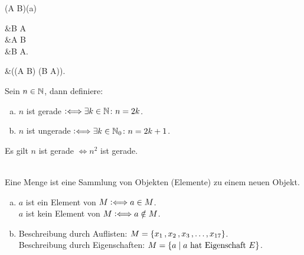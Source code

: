 \documentclass[../ana1.tex]{subfiles}
\begin{document}
\begin{bem}\leavevmode
	\begin{alignenum}{(A \Leftrightarrow B)}{(a)}
		\begin{aitem}
			 &\Leftrightarrow B  A\\
										  &\Leftrightarrow A  B\\
										  &\Leftrightarrow \neg B \Rightarrow \neg A.
		\end{aitem}\begin{aitem}
			 &\Leftrightarrow ((A \Rightarrow B) \wedge (B \Rightarrow A)).
		\end{aitem}
	\end{alignenum}
\end{bem}

\begin{defi*}
	Sein \(n \in \mathbb{N}\), dann definiere:
	\begin{enumerate}[(a)]
		\item \(n\) ist gerade \(\mathrel{\vcentcolon\Longleftrightarrow} \exists k \in \mathbb{N} \colon n = 2k\).
		\item \(n\) ist ungerade \(\mathrel{\vcentcolon\Longleftrightarrow} \exists k \in \mathbb{N}_{0} \colon n = 2k + 1\).
	\end{enumerate}
\end{defi*}

\begin{bsp}
	Es gilt \(n\) ist gerade \(\iff n^2\) ist gerade.
	\begin{bew}
	\end{bew}
\end{bsp}

\begin{defi*}\leavevmode\\
	Eine Menge ist eine Sammlung von Objekten (Elemente) zu einem neuen Objekt.
\end{defi*}

\begin{notation}\leavevmode
	\begin{enumerate}[(a)]
		\item \(a\) ist ein Element von \(M \mathrel{\vcentcolon\Longleftrightarrow} a \in M\).\\
			  \(a\) ist kein Element von \(M \mathrel{\vcentcolon\Longleftrightarrow} a \notin M\).
		\item Beschreibung durch Auflisten: \(M = \{x_{1} \operatorname{,} x_{2} \operatorname{,} x_{3} \operatorname{,} \ldots \operatorname{,} x_{17}\}\).\\
			  Beschreibung durch Eigenschaften: \(M = \{a \; \vert \; a \text{ hat Eigenschaft } E\}\).
	\end{enumerate}
\end{notation}
\end{document}
